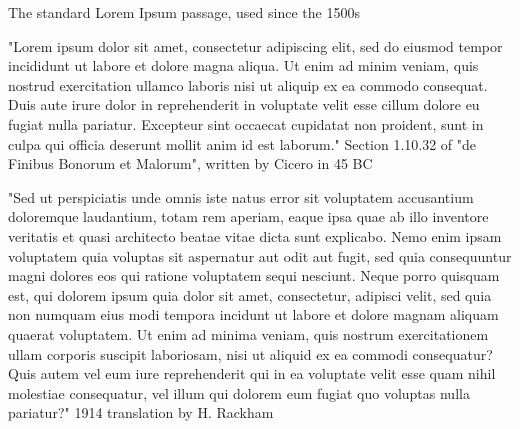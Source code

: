 \documentclass[10pt,landscape,a4paper]{article}
\begin{document}
\small
\begin{multicols*}{4}



\vfill\null
\columnbreak


\vfill\null
\columnbreak

\vfill\null
\columnbreak

\vfill\null
\columnbreak








The standard Lorem Ipsum passage, used since the 1500s

"Lorem ipsum dolor sit amet, consectetur adipiscing elit, sed do eiusmod tempor incididunt ut labore et dolore magna aliqua. Ut enim ad minim veniam, quis nostrud exercitation ullamco laboris nisi ut aliquip ex ea commodo consequat. Duis aute irure dolor in reprehenderit in voluptate velit esse cillum dolore eu fugiat nulla pariatur. Excepteur sint occaecat cupidatat non proident, sunt in culpa qui officia deserunt mollit anim id est laborum."
Section 1.10.32 of "de Finibus Bonorum et Malorum", written by Cicero in 45 BC

"Sed ut perspiciatis unde omnis iste natus error sit voluptatem accusantium doloremque laudantium, totam rem aperiam, eaque ipsa quae ab illo inventore veritatis et quasi architecto beatae vitae dicta sunt explicabo. Nemo enim ipsam voluptatem quia voluptas sit aspernatur aut odit aut fugit, sed quia consequuntur magni dolores eos qui ratione voluptatem sequi nesciunt. Neque porro quisquam est, qui dolorem ipsum quia dolor sit amet, consectetur, adipisci velit, sed quia non numquam eius modi tempora incidunt ut labore et dolore magnam aliquam quaerat voluptatem. Ut enim ad minima veniam, quis nostrum exercitationem ullam corporis suscipit laboriosam, nisi ut aliquid ex ea commodi consequatur? Quis autem vel eum iure reprehenderit qui in ea voluptate velit esse quam nihil molestiae consequatur, vel illum qui dolorem eum fugiat quo voluptas nulla pariatur?"
1914 translation by H. Rackham


\end{multicols*}
\end{document}
